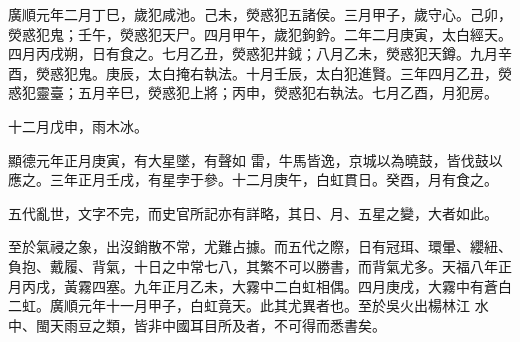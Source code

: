 \begin{pinyinscope}
 廣順元年二月丁巳，歲犯咸池。己未，熒惑犯五諸侯。三月甲子，歲守心。己卯，熒惑犯鬼；壬午，熒惑犯天尸。四月甲午，歲犯鉤鈐。二年二月庚寅，太白經天。四月丙戌朔，日有食之。七月乙丑，熒惑犯井鉞；八月乙未，熒惑犯天鐏。九月辛酉，熒惑犯鬼。庚辰，太白掩右執法。十月壬辰，太白犯進賢。三年四月乙丑，熒惑犯靈臺；五月辛巳，熒惑犯上將；丙申，熒惑犯右執法。七月乙酉，月犯房。



 十二月戊申，雨木冰。



 顯德元年正月庚寅，有大星墜，有聲如
 雷，牛馬皆逸，京城以為曉鼓，皆伐鼓以應之。三年正月壬戌，有星孛于參。十二月庚午，白虹貫日。癸酉，月有食之。



 五代亂世，文字不完，而史官所記亦有詳略，其日、月、五星之變，大者如此。



 至於氣祲之象，出沒銷散不常，尤難占據。而五代之際，日有冠珥、環暈、纓紐、負抱、戴履、背氣，十日之中常七八，其繁不可以勝書，而背氣尤多。天福八年正月丙戌，黃霧四塞。九年正月乙未，大霧中二白虹相偶。四月庚戌，大霧中有蒼白二虹。廣順元年十一月甲子，白虹竟天。此其尤異者也。至於吳火出楊林江
 水中、閩天雨豆之類，皆非中國耳目所及者，不可得而悉書矣。



\end{pinyinscope}